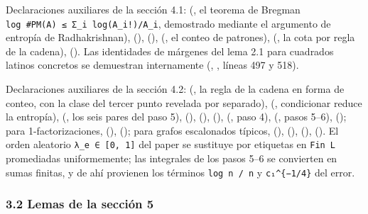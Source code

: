 \documentclass[spanish,11pt,a4paper]{article}
\begin{document}
Declaraciones auxiliares de la sección 4.1:  (, el teorema de Bregman \texttt{log\ \#PM(A)\ ≤\ Σ\_i\ log(\textbar{}A\_i\textbar{}!)/\textbar{}A\_i\textbar{}}, demostrado mediante el argumento de entropía de Radhakrishnan),  (),  (),  (, el conteo de patrones),  (, la cota por regla de la cadena),  (). Las identidades de márgenes del lema 2.1 para cuadrados latinos concretos se demuestran internamente (, , líneas 497 y 518).

Declaraciones auxiliares de la sección 4.2:  (, la regla de la cadena en forma de conteo, con la clase del tercer punto revelada por separado),  (, condicionar reduce la entropía),  (, los seis pares del paso 5),  (),  (),  (),  (, paso 4),  (, pasos 5--6),  (); para 1-factorizaciones,  (),  (); para grafos escalonados típicos,  (),  (),  (),  (). El orden aleatorio \texttt{λ\_e\ ∈\ {[}0,\ 1{]}} del paper se sustituye por etiquetas en \texttt{Fin\ L} promediadas uniformemente; las integrales de los pasos 5--6 se convierten en sumas finitas, y de ahí provienen los términos \texttt{log\ n\ /\ n} y \texttt{c₁\^{}\{−1/4\}} del error.

\subsubsection{3.2 Lemas de la sección 5}\label{lemas-de-la-secciuxf3n-5}
\end{document}
